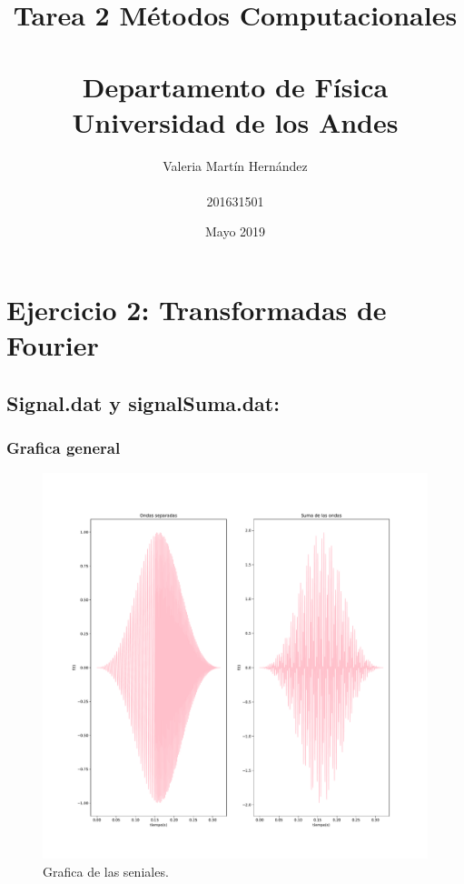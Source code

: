 \documentclass[11pt,letterpaper]{exam}
\title{Tarea 2 Métodos Computacionales\\\\ Departamento de Física \\ Universidad de los Andes}
\author{Valeria Martín Hernández\\\\201631501}
\date{Mayo 2019}
\begin{document}
\maketitle
\newpage


\addcontentsline{}{}{}
\tableofcontents

\newpage


\section{Ejercicio 2: Transformadas de Fourier}
\subsection{Signal.dat y signalSuma.dat:}
\subsubsection{Grafica general}
\begin{figure}[H]
    \centering
    \includegraphics[width=1.1\textwidth]{signals.pdf}
    \caption{Grafica de las seniales.}
    \label{fig:my_label}
\end{figure}
\end{document}
